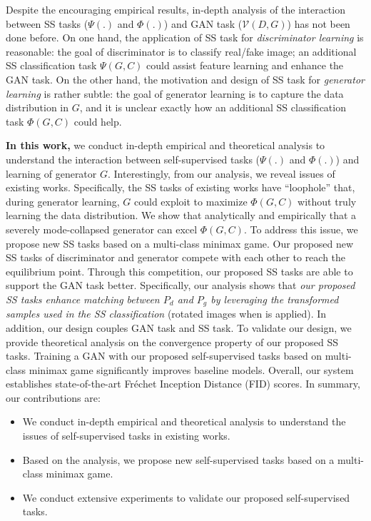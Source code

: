 \documentclass{article}
\begin{document}
Despite the encouraging empirical results, in-depth analysis of the interaction between SS tasks ($\Psi(.)$ and $\Phi(.)$) and GAN task ($\mathcal{V}(D,G)$) has not been done before.
On one hand, the application of SS task for {\em discriminator learning} is reasonable: the goal of discriminator is to classify real/fake image; an additional SS classification task $\Psi(G,C)$ could assist feature learning and enhance the GAN task. On the other hand, the motivation and design of SS task for {\em generator learning} is rather subtle: the goal of generator learning is to capture the data distribution in $G$, and it is unclear exactly how an additional SS classification task $\Phi(G,C)$ could help.






{\bf In this work,} we conduct in-depth empirical and theoretical analysis to understand the interaction between self-supervised tasks ($\Psi(.)$ and $\Phi(.)$) and learning of generator $G$.
Interestingly, from our analysis,
we reveal issues of existing works. 
Specifically, 
the SS tasks of existing works have ``loophole'' that, during generator learning, $G$ could exploit to maximize $\Phi(G,C)$ without truly learning the data distribution. We show that analytically and empirically that a severely mode-collapsed generator can excel $\Phi(G,C)$. 
To address this issue, we
propose new SS tasks based on a multi-class minimax game.
Our proposed new SS tasks of discriminator and generator 
compete with each other to reach the equilibrium point. Through this competition, our proposed SS tasks are able to support the GAN task better. Specifically, our analysis shows that {\em our proposed SS tasks enhance matching between $P_d$ and $P_g$ by leveraging the transformed samples used in the SS classification} (rotated images when 
\cite{gidaris-iclr-2018} is applied).
In addition, our design couples GAN task and SS task. To validate our design, 
we provide theoretical analysis on the convergence property of our proposed SS tasks. Training a GAN with our proposed self-supervised tasks based on multi-class minimax game significantly improves baseline models. Overall, our system  establishes state-of-the-art Fr{\'e}chet Inception Distance (FID) scores.
In summary, our contributions are:
\begin{itemize}
	\item We conduct in-depth empirical and theoretical analysis to understand the issues of self-supervised tasks in existing works.
	\item Based on the analysis, we propose new self-supervised tasks based on a multi-class minimax game.
	\item We conduct extensive experiments to validate our proposed self-supervised tasks.
\end{itemize}
\end{document}
